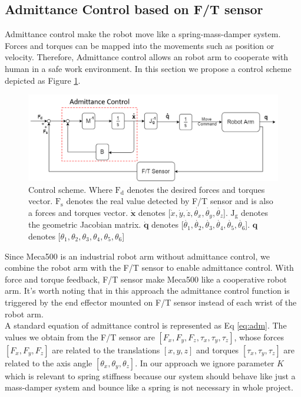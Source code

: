 \subsection{Admittance Control based on F/T sensor}
\label{sec:adm ctrl}
Admittance control make the robot move like a spring-mass-damper system. Forces and torques can be mapped into the movements such as position or velocity. Therefore, Admittance control allows an robot arm to cooperate with human in a safe work environment. In this section we propose a control scheme depicted as Figure \ref{fig:adm ctrl}.
\begin{figure}[H]
\begin{center}
\includegraphics[width=1\linewidth]{Images/adm ctrl.png}
\end{center}
\caption{
Control scheme. Where $\text{F}_{\text{d}}$ denotes the desired forces and torques vector. $\text{F}_{\text{s}}$ denotes the real value detected by F/T sensor and is also a forces and torques vector. $\dot{\textbf{x}}$ denotes [$\dot{x}, \dot{y}, \dot{z}, \dot{\theta _x}, \dot{\theta _y}, \dot{\theta _z}$]. $\text{J}_{\text{g}}$ denotes the geometric Jacobian matrix. $\dot{\textbf{q}}$ denotes [$\dot{\theta _1}, \dot{\theta _2}, \dot{\theta _3}, \dot{\theta _4}, \dot{\theta _5}, \dot{\theta _6}$]. $\textbf{q}$ denotes [$\theta _1, \theta _2, \theta _3, \theta _4, \theta _5, \theta _6 $]
}\label{fig:adm ctrl}
\end{figure} 
Since Meca500 is an industrial robot arm without admittance control, we combine the robot arm with the F/T sensor to enable admittance control. With force and torque feedback, F/T sensor make Meca500 like a cooperative robot arm. It's worth noting that in this approach the admittance control function is triggered by the end effector mounted on F/T sensor instead of each wrist of the robot arm.\\
A standard equation of admittance control is represented as Eq \ref{eq:adm}. The values we obtain from the F/T sensor are $\left[F_x, F_y, F_z,\tau _x, \tau _y, \tau _z \right]$, whose forces $ \left[F_x, F_y, F_z\right]$ are related to the translations $ \left[x, y, z\right]$ and torques $ \left[\tau _x, \tau _y, \tau _z\right]$ are related to the axis angle $ \left[\theta _x,\theta _y,\theta _z\right]$. In our approach we ignore parameter $K$ which is relevant to spring stiffness because our system should behave like just a mass-damper system and   bounce like a spring is not necessary in whole project.   
